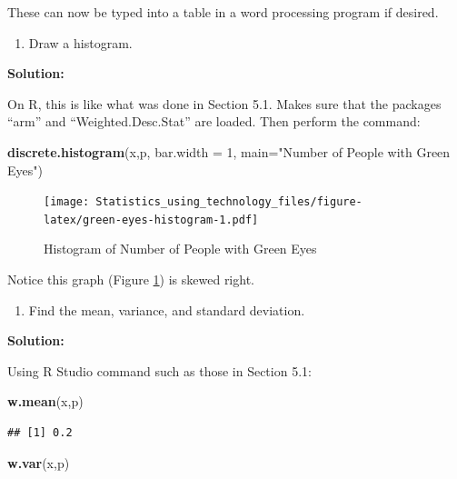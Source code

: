 \documentclass[
]{book}
\newenvironment{Shaded}{\begin{snugshade}}{\end{snugshade}}
\newcommand{\DataTypeTok}[1]{\textcolor[rgb]{0.13,0.29,0.53}{#1}}
\newcommand{\DecValTok}[1]{\textcolor[rgb]{0.00,0.00,0.81}{#1}}
\newcommand{\KeywordTok}[1]{\textcolor[rgb]{0.13,0.29,0.53}{\textbf{#1}}}
\newcommand{\NormalTok}[1]{#1}
\newcommand{\StringTok}[1]{\textcolor[rgb]{0.31,0.60,0.02}{#1}}
\providecommand{\tightlist}{%
  \setlength{\itemsep}{0pt}\setlength{\parskip}{0pt}}
\begin{document}
These can now be typed into a table in a word processing program if desired.

\begin{enumerate}
\def\labelenumi{\alph{enumi}.}
\setcounter{enumi}{2}
\tightlist
\item
  Draw a histogram.
\end{enumerate}

\textbf{Solution:}

On R, this is like what was done in Section 5.1. Makes sure that the packages ``arm'' and ``Weighted.Desc.Stat'' are loaded. Then perform the command:



\begin{Shaded}
\begin{Highlighting}[]
\KeywordTok{discrete.histogram}\NormalTok{(x,p, }\DataTypeTok{bar.width =} \DecValTok{1}\NormalTok{, }\DataTypeTok{main=}\StringTok{"Number of People with Green Eyes"}\NormalTok{)}
\end{Highlighting}
\end{Shaded}

\begin{figure}
\centering
\texttt{[image: Statistics\_using\_technology\_files/figure-latex/green-eyes-histogram-1.pdf]}
\caption{\label{fig:green-eyes-histogram}Histogram of Number of People with Green Eyes}
\end{figure}

Notice this graph (Figure \ref{fig:green-eyes-histogram}) is skewed right.

\begin{enumerate}
\def\labelenumi{\alph{enumi}.}
\setcounter{enumi}{3}
\tightlist
\item
  Find the mean, variance, and standard deviation.
\end{enumerate}

\textbf{Solution:}

Using R Studio command such as those in Section 5.1:

\begin{Shaded}
\begin{Highlighting}[]
\KeywordTok{w.mean}\NormalTok{(x,p)}
\end{Highlighting}
\end{Shaded}

\begin{verbatim}
## [1] 0.2
\end{verbatim}

\begin{Shaded}
\begin{Highlighting}[]
\KeywordTok{w.var}\NormalTok{(x,p)}
\end{Highlighting}
\end{Shaded}
\end{document}

